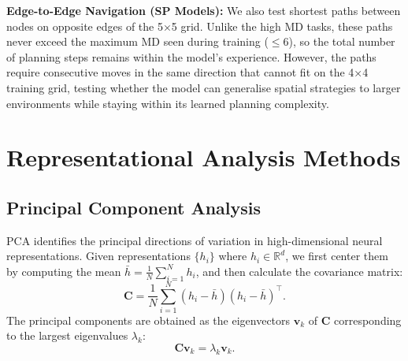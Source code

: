 \textbf{Edge-to-Edge Navigation (SP Models):} We also test shortest paths between nodes on opposite edges of the 5×5 grid. Unlike the high MD tasks, these paths never exceed the maximum MD seen during training ($\le 6$), so the total number of planning steps remains within the model’s experience. However, the paths require consecutive moves in the same direction that cannot fit on the 4×4 training grid, testing whether the model can generalise spatial strategies to larger environments while staying within its learned planning complexity.





\section{Representational Analysis Methods}

\subsection{Principal Component Analysis}

PCA identifies the principal directions of variation in high-dimensional neural representations. Given representations $\{h_i\}$ where $h_i \in \mathbb{R}^d$, we first center them by computing the mean $\bar{h} = \frac{1}{N} \sum_{i=1}^N h_i$, and then calculate the covariance matrix:
\begin{equation}
\mathbf{C} = \frac{1}{N} \sum_{i=1}^N (h_i - \bar{h})(h_i - \bar{h})^\top.
\end{equation}
The principal components are obtained as the eigenvectors $\mathbf{v}_k$ of $\mathbf{C}$ corresponding to the largest eigenvalues $\lambda_k$:
\begin{equation}
\mathbf{C} \mathbf{v}_k = \lambda_k \mathbf{v}_k.
\end{equation}


